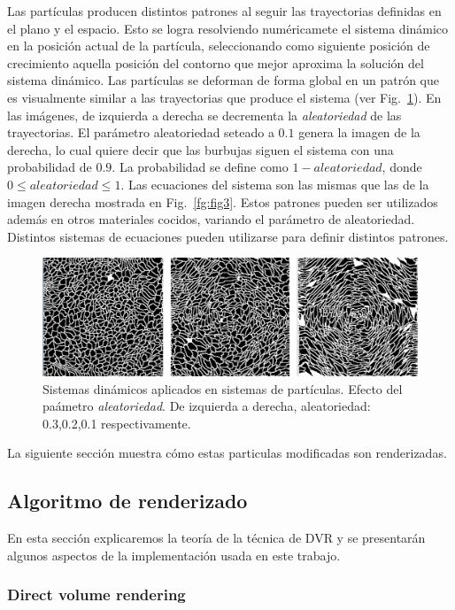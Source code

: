 \documentclass[oneside,a4paper,spanish,links]{amca}
\begin{document}
Las part\'iculas producen distintos patrones al seguir las trayectorias definidas en el plano y el espacio. Esto se logra resolviendo num\'ericamete el sistema din\'amico en la posici\'on actual de la part\'icula, seleccionando como siguiente posici\'on de crecimiento aquella posici\'on del contorno que mejor aproxima la soluci\'on del sistema din\'amico. Las part\'iculas se deforman de forma global en un patr\'on que es visualmente similar a las trayectorias que produce el sistema (ver Fig.~\ref{fg:fig4}). En las im\'agenes, de izquierda a derecha se decrementa la {\em aleatoriedad} de las trayectorias. El par\'ametro aleatoriedad seteado a $0.1$ genera la imagen de la derecha, lo cual quiere decir que las burbujas siguen el sistema con una probabilidad de $0.9$. La probabilidad se define como $1-aleatoriedad$, donde $0 \leq aleatoriedad \leq 1$. Las ecuaciones del sistema son las mismas que las de la imagen derecha mostrada en Fig.~\ref{fg:fig3}. Estos patrones pueden ser utilizados adem\'as en otros materiales cocidos, variando el par\'ametro de aleatoriedad. Distintos sistemas de ecuaciones pueden utilizarse para definir distintos patrones.

\begin{figure}[htb!]
  \centerline{\includegraphics[scale=0.21]{fig4}}
  \caption{Sistemas din\'amicos aplicados en sistemas de part\'iculas. Efecto del pa\'ametro {\em aleatoriedad}. De izquierda a derecha, aleatoriedad: 0.3,0.2,0.1 respectivamente. }
  \label{fg:fig4}
\end{figure}

La siguiente secci\'on muestra c\'omo estas particulas modificadas son renderizadas.

\subsection{Algoritmo de renderizado}

En esta sección explicaremos la teoría de la técnica de DVR y se
presentarán algunos aspectos de la implementación usada en este
trabajo.

\subsubsection{Direct volume rendering}
\end{document}
